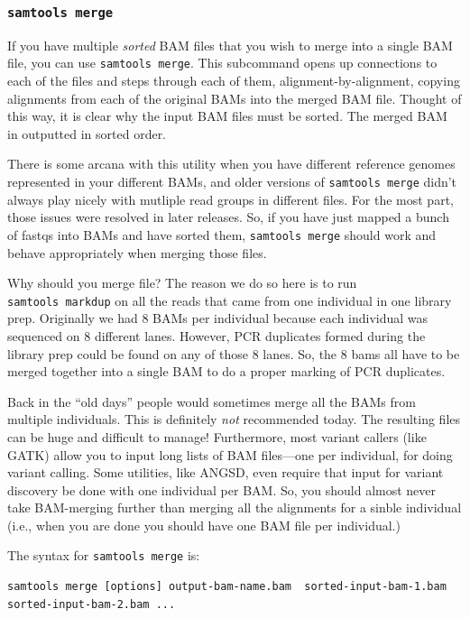 \documentclass[]{krantz}
\begin{document}
\hypertarget{samtools-merge}{%
\subsubsection{\texorpdfstring{\texttt{samtools\ merge}}{samtools merge}}\label{samtools-merge}}

If you have multiple \emph{sorted} BAM files that you wish to merge into a single
BAM file, you can use \texttt{samtools\ merge}. This subcommand opens up connections
to each of the files and steps through each of them, alignment-by-alignment, copying
alignments from each of the original BAMs into the merged BAM file. Thought of this
way, it is clear why the input BAM files must be sorted. The merged BAM in outputted in
sorted order.

There is some arcana with this utility when you have different reference genomes
represented in your different BAMs, and older versions of \texttt{samtools\ merge} didn't always
play nicely with mutliple read groups in different files. For the most part, those issues
were resolved in later releases. So, if you have just mapped a bunch of fastqs into BAMs and
have sorted them, \texttt{samtools\ merge} should work and behave appropriately when merging those files.

Why should you merge file? The reason we do so here is to run \texttt{samtools\ markdup} on all the
reads that came from one individual in one library prep. Originally we had 8 BAMs per individual
because each individual was sequenced on 8 different lanes. However, PCR duplicates formed during the
library prep could be found on any of those 8 lanes. So, the 8 bams all have to be merged
together into a single BAM to do a proper marking of PCR duplicates.

Back in the ``old days'' people would sometimes merge all the BAMs from multiple individuals.
This is definitely \emph{not} recommended today. The resulting files can be huge and difficult to
manage! Furthermore, most variant callers (like GATK) allow you to input long lists of BAM files---one
per individual, for doing variant calling. Some utilities, like ANGSD, even require that input
for variant discovery be done with one individual per BAM. So, you should almost never take
BAM-merging further than merging all the alignments for a sinble individual (i.e., when you are
done you should have one BAM file per
individual.)

The syntax for \texttt{samtools\ merge} is:

\begin{verbatim}
samtools merge [options] output-bam-name.bam  sorted-input-bam-1.bam sorted-input-bam-2.bam ...
\end{verbatim}
\end{document}
